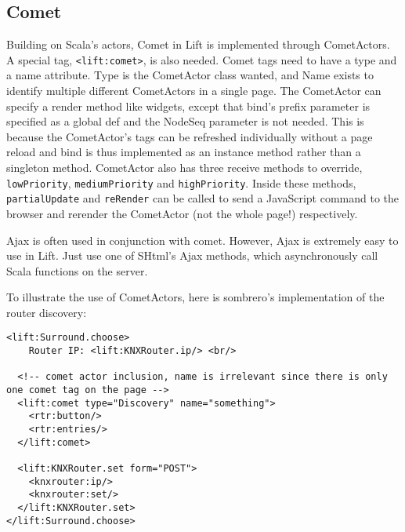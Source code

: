 \subsection{Comet}

Building on Scala's actors, Comet in Lift is implemented through CometActors. A special tag, \lstinline!<lift:comet>!, is also needed. Comet tags need to have a type and a name attribute. Type is the CometActor class wanted, and Name exists to identify multiple different CometActors in a single page. The CometActor can specify a render method like widgets, except that bind's prefix parameter is specified as a global def and the NodeSeq parameter is not needed. This is because the CometActor's tags can be refreshed individually without a page reload and bind is thus implemented as an instance method rather than a singleton method. CometActor also has three receive methods to override, \lstinline!lowPriority!, \lstinline!mediumPriority! and \lstinline!highPriority!. Inside these methods, \lstinline!partialUpdate! and \lstinline!reRender! can be called to send a JavaScript command to the browser and rerender the CometActor (not the whole page!) respectively.

Ajax is often used in conjunction with comet. However, Ajax is extremely easy to use in Lift. Just use one of SHtml's Ajax methods, which asynchronously call Scala functions on the server.

To illustrate the use of CometActors, here is sombrero's implementation of the router discovery:

\begin{lstlisting}[caption=Lift Comet: discovery.html,label=lst:lift:cometxhtml]
<lift:Surround.choose>
    Router IP: <lift:KNXRouter.ip/> <br/>

  <!-- comet actor inclusion, name is irrelevant since there is only one comet tag on the page -->
  <lift:comet type="Discovery" name="something">
    <rtr:button/>
    <rtr:entries/>
  </lift:comet>

  <lift:KNXRouter.set form="POST">
    <knxrouter:ip/>
    <knxrouter:set/>
  </lift:KNXRouter.set>
</lift:Surround.choose>
\end{lstlisting}

